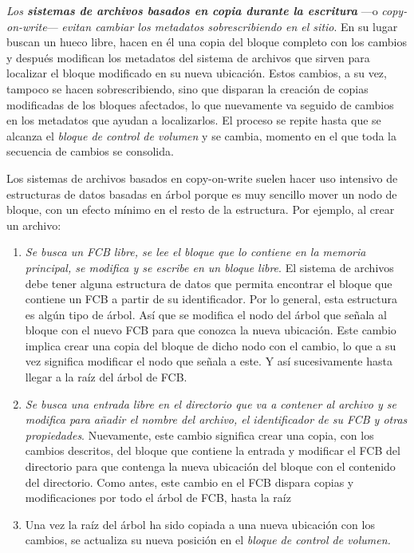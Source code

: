 \emph{Los \textbf{sistemas de archivos basados en copia durante la
escritura}} ---o \emph{copy-on-write}--- \emph{evitan cambiar los
metadatos sobrescribiendo en el sitio}. En su lugar buscan un hueco
libre, hacen en él una copia del bloque completo con los cambios y
después modifican los metadatos del sistema de archivos que sirven para
localizar el bloque modificado en su nueva ubicación. Estos cambios, a
su vez, tampoco se hacen sobrescribiendo, sino que disparan la creación
de copias modificadas de los bloques afectados, lo que nuevamente va
seguido de cambios en los metadatos que ayudan a localizarlos. El
proceso se repite hasta que se alcanza el \emph{bloque de control de
volumen} y se cambia, momento en el que toda la secuencia de cambios se
consolida.

Los sistemas de archivos basados en copy-on-write suelen hacer uso
intensivo de estructuras de datos basadas en árbol porque es muy
sencillo mover un nodo de bloque, con un efecto mínimo en el resto de la
estructura. Por ejemplo, al crear un archivo:

\begin{enumerate}
\def\labelenumi{\arabic{enumi}.}
\item
  \emph{Se busca un FCB libre, se lee el bloque que lo contiene en la
  memoria principal, se modifica y se escribe en un bloque libre}. El
  sistema de archivos debe tener alguna estructura de datos que permita
  encontrar el bloque que contiene un FCB a partir de su identificador.
  Por lo general, esta estructura es algún tipo de árbol. Así que se
  modifica el nodo del árbol que señala al bloque con el nuevo FCB para
  que conozca la nueva ubicación. Este cambio implica crear una copia
  del bloque de dicho nodo con el cambio, lo que a su vez significa
  modificar el nodo que señala a este. Y así sucesivamente hasta llegar
  a la raíz del árbol de FCB.
\item
  \emph{Se busca una entrada libre en el directorio que va a contener al
  archivo y se modifica para añadir el nombre del archivo, el
  identificador de su FCB y otras propiedades}. Nuevamente, este cambio
  significa crear una copia, con los cambios descritos, del bloque que
  contiene la entrada y modificar el FCB del directorio para que
  contenga la nueva ubicación del bloque con el contenido del
  directorio. Como antes, este cambio en el FCB dispara copias y
  modificaciones por todo el árbol de FCB, hasta la raíz
\item
  Una vez la raíz del árbol ha sido copiada a una nueva ubicación con
  los cambios, se actualiza su nueva posición en el \emph{bloque de
  control de volumen.}
\end{enumerate}

